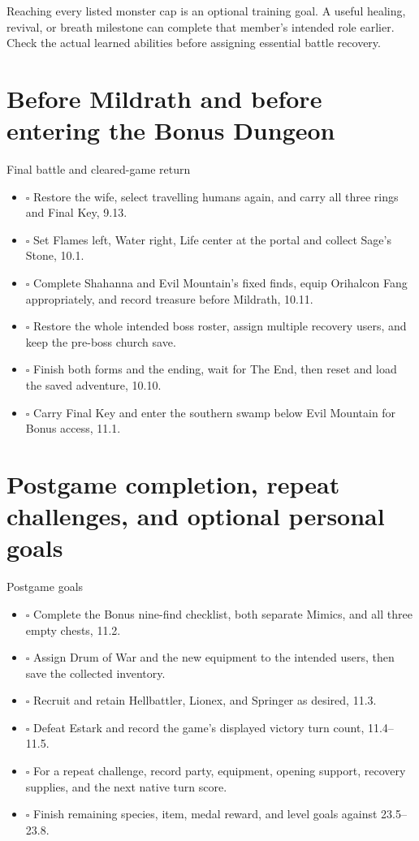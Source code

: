 Reaching every listed monster cap is an optional training goal. A
useful healing, revival, or breath milestone can complete that member's
intended role earlier. Check the actual learned abilities before
assigning essential battle recovery.

\section{Before Mildrath and before entering the Bonus Dungeon}

\begin{routecheck}[breakable=false]{Final battle and cleared-game return}
\begin{itemize}
\item \(\square\) Restore the wife, select travelling humans again, and carry all three rings and Final Key, 9.13.
\item \(\square\) Set Flames left, Water right, Life center at the portal and collect Sage's Stone, 10.1.
\item \(\square\) Complete Shahanna and Evil Mountain's fixed finds, equip Orihalcon Fang appropriately, and record treasure before Mildrath, 10.11.
\item \(\square\) Restore the whole intended boss roster, assign multiple recovery users, and keep the pre-boss church save.
\item \(\square\) Finish both forms and the ending, wait for The End, then reset and load the saved adventure, 10.10.
\item \(\square\) Carry Final Key and enter the southern swamp below Evil Mountain for Bonus access, 11.1.
\end{itemize}
\end{routecheck}

\section{Postgame completion, repeat challenges, and optional personal goals}

\begin{routecheck}[breakable=false]{Postgame goals}
\begin{itemize}
\item \(\square\) Complete the Bonus nine-find checklist, both separate Mimics, and all three empty chests, 11.2.
\item \(\square\) Assign Drum of War and the new equipment to the intended users, then save the collected inventory.
\item \(\square\) Recruit and retain Hellbattler, Lionex, and Springer as desired, 11.3.
\item \(\square\) Defeat Estark and record the game's displayed victory turn count, 11.4--11.5.
\item \(\square\) For a repeat challenge, record party, equipment, opening support, recovery supplies, and the next native turn score.
\item \(\square\) Finish remaining species, item, medal reward, and level goals against 23.5--23.8.
\end{itemize}
\end{routecheck}

